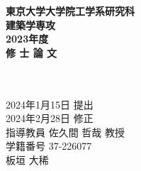 \documentclass[11pt,a4j]{jreport}
\begin{document}
\thispagestyle{empty}

\begin{center}
  \vspace{20mm}
  {\Large\noindent\textbf{東京大学大学院工学系研究科}}\\
  \medskip
  {\Large\noindent\textbf{建築学専攻}}\\
  \vspace{30mm}
  {\Large\noindent\textbf{2023年度}}\\
  \medskip
  {\huge\noindent\textbf{修 士 論 文}}\\
  \vspace{30mm}
  {\huge{}}\\
  \medskip
  {\huge{}}\\
  \vspace{70mm}

  {\Large\noindent
  2024年1月15日 提出\\
  2024年2月28日 修正\\
  指導教員 佐久間 哲哉 教授    \\
  \vspace{\baselineskip}
  学籍番号 37-226077 \\
  \vspace{\baselineskip}
  板垣 大稀\\
  }
  \vspace{40mm}

\end{center}

\thispagestyle{empty}
\clearpage
\end{document}
